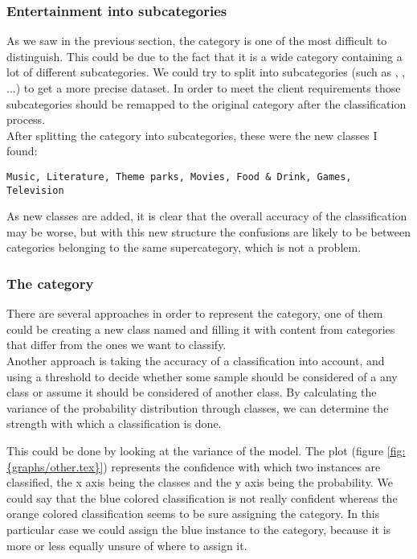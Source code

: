 \subsubsection{Entertainment into subcategories}
As we saw in the previous section, the category  is one of the most difficult to distinguish. This could be due to the fact that it is a wide category containing a lot of different
subcategories. We could try to split  into subcategories (such as , , ...) to get a more precise dataset. In order to meet the
client requirements those subcategories should be remapped to the original  category after the classification process. \\
After splitting the  category into subcategories, these were the new classes I found: \\
\begin{lstlisting} 
Music, Literature, Theme parks, Movies, Food & Drink, Games, Television
\end{lstlisting} 
As new classes are added, it is clear that the overall accuracy of the classification may be worse, but with this new structure the confusions are likely to be between categories belonging to the same
supercategory, which is not a problem.
 

\subsubsection{The  category}
There are several approaches in order to represent the  category, one of them could be creating a new class named  and filling it with content from categories that 
differ from the ones we want to classify.\\
Another approach is taking the accuracy of a classification into account, and using a threshold to decide whether some sample should be considered of a any class or assume it should be considered of 
another class. 
By calculating the variance of the probability distribution through classes, we can determine the strength with which a classification is done.   



This could be done by looking at the variance of the model. The plot (figure \ref{fig:{graphs/other.tex}}) represents the confidence with which two instances are classified, the x axis being the classes
and the y axis being the probability. We could say that the blue colored classification is not really confident whereas the orange colored classification seems to be sure assigning the  
category. In this particular case we could assign the blue instance to the  category, because it is more or less equally unsure of where to assign it.


